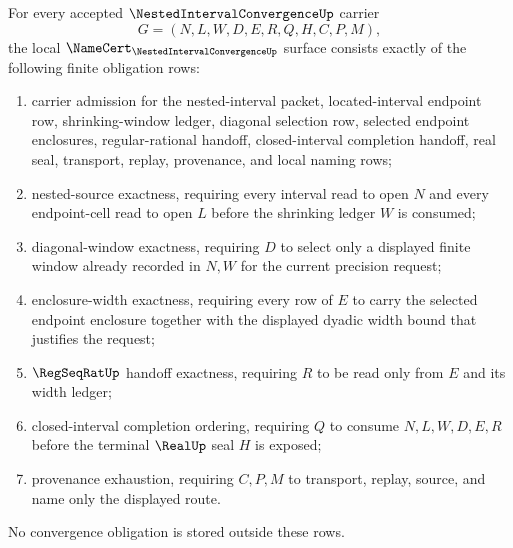 \begin{theorem}
\label{thm:nested-interval-convergence-namecert-obligations}
For every accepted $\NestedIntervalConvergenceUp$ carrier
$$
G=(N,L,W,D,E,R,Q,H,C,P,M),
$$
the local $\NameCert_{\NestedIntervalConvergenceUp}$ surface consists exactly of the following finite obligation rows:
\begin{enumerate}
\item carrier admission for the nested-interval packet, located-interval endpoint row, shrinking-window ledger, diagonal selection row, selected endpoint enclosures, regular-rational handoff, closed-interval completion handoff, real seal, transport, replay, provenance, and local naming rows;
\item nested-source exactness, requiring every interval read to open $N$ and every endpoint-cell read to open $L$ before the shrinking ledger $W$ is consumed;
\item diagonal-window exactness, requiring $D$ to select only a displayed finite window already recorded in $N,W$ for the current precision request;
\item enclosure-width exactness, requiring every row of $E$ to carry the selected endpoint enclosure together with the displayed dyadic width bound that justifies the request;
\item $\RegSeqRatUp$ handoff exactness, requiring $R$ to be read only from $E$ and its width ledger;
\item closed-interval completion ordering, requiring $Q$ to consume $N,L,W,D,E,R$ before the terminal $\RealUp$ seal $H$ is exposed;
\item provenance exhaustion, requiring $C,P,M$ to transport, replay, source, and name only the displayed route.
\end{enumerate}
No convergence obligation is stored outside these rows.
\end{theorem}
